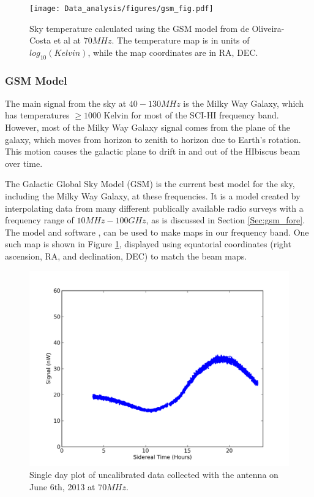 \begin{figure}[htb]
\begin{center}
\texttt{[image: Data\_analysis/figures/gsm\_fig.pdf]}
\caption{Sky temperature calculated using the GSM model from de Oliveira-Costa et al \cite{GSM_model} at $70 MHz$. The temperature map is in units of $log_{10}( Kelvin)$, while the map coordinates are in RA, DEC. }
\label{Fig:GSM_model}
\end{center}
\end{figure}

\subsubsection{GSM Model}\label{Sec:GSM}

The main signal from the sky at $40-130 MHz$ is the Milky Way Galaxy, which has temperatures $\geq 1000$ Kelvin for most of the SCI-HI frequency band. However, most of the Milky Way Galaxy signal comes from the plane of the galaxy, which moves from horizon to zenith to horizon due to Earth's rotation. This motion causes the galactic plane to drift in and out of the HIbiscus beam over time. 

The Galactic Global Sky Model (GSM) is the current best model for the sky, including the Milky Way Galaxy, at these frequencies. It is a model created by interpolating data from many different publically available radio surveys with a frequency range of $10 MHz - 100 GHz$, as is discussed in Section \ref{Sec:gsm_fore}. The model and software \cite{GSM_model}, can be used to make maps in our frequency band. One such map is shown in Figure \ref{Fig:GSM_model}, displayed using equatorial coordinates (right ascension, RA, and declination, DEC) to match the beam maps. 

\begin{figure}[htb]
\begin{center}
\includegraphics[width=0.9\linewidth]{Data_analysis/figures/June_06_time_series_uncal_70mhz.png}
\caption{Single day plot of uncalibrated data collected with the antenna on June 6th, 2013 at $70 MHz$.}
\label{Fig:raw_time_series}
\end{center}
\end{figure}

